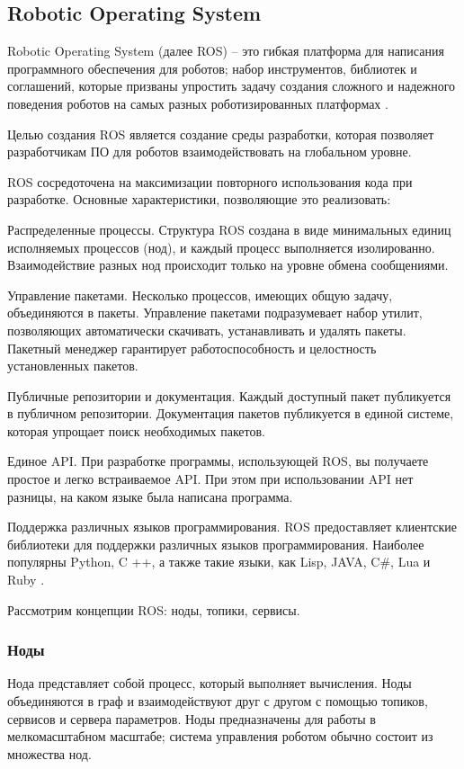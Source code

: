\subsection{Robotic Operating System}

Robotic Operating System (далее ROS) -- это гибкая платформа для написания программного обеспечения для роботов; набор инструментов, библиотек и соглашений, которые призваны упростить задачу создания сложного и надежного поведения роботов на самых разных роботизированных платформах \cite{ros}.

Целью создания ROS является создание среды разработки, которая позволяет разработчикам ПО для роботов взаимодействовать на глобальном уровне.

ROS сосредоточена на максимизации повторного использования кода при разработке. Основные характеристики, позволяющие это реализовать:

Распределенные процессы. Структура ROS создана в виде минимальных единиц исполняемых процессов (нод), и каждый процесс выполняется изолированно. Взаимодействие разных нод происходит только на уровне обмена сообщениями.

Управление пакетами. Несколько процессов, имеющих общую задачу, объединяются в пакеты. Управление пакетами подразумевает набор утилит, позволяющих автоматически скачивать, устанавливать и удалять пакеты. Пакетный менеджер гарантирует работоспособность и целостность установленных пакетов.

Публичные репозитории и документация. Каждый доступный пакет публикуется в публичном репозитории. Документация пакетов публикуется в единой системе, которая упрощает поиск необходимых пакетов.

Единое API. При разработке программы, использующей ROS, вы получаете простое и легко встраиваемое API. При этом при использовании API нет разницы, на каком языке была написана программа.

Поддержка различных языков программирования. ROS предоставляет клиентские библиотеки для поддержки различных языков программирования. Наиболее популярны Python, C ++, а также такие языки, как Lisp, JAVA, C\#, Lua и Ruby \cite{voltbro}.

Рассмотрим концепции ROS: ноды, топики, сервисы.

\subsubsection{Ноды}
Нода представляет собой процесс, который выполняет вычисления. Ноды объединяются в граф и взаимодействуют друг с другом с помощью топиков, сервисов и сервера параметров. Ноды предназначены для работы в мелкомасштабном масштабе; система управления роботом обычно состоит из множества нод.

